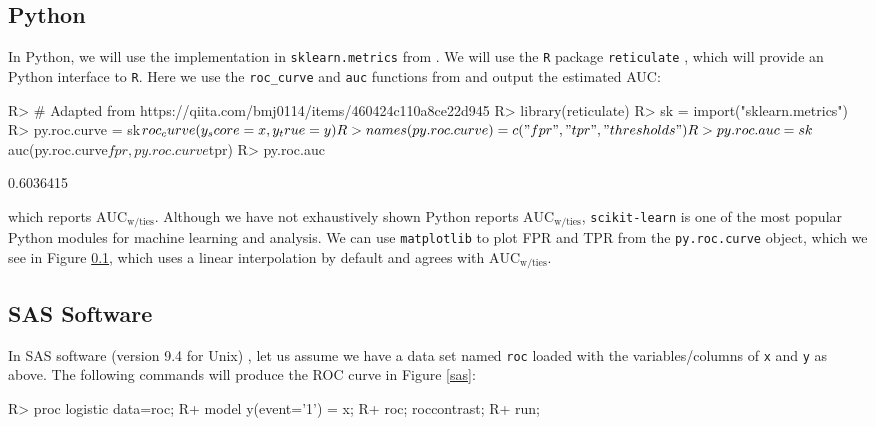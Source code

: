 \documentclass[article]{jss}
\begin{document}
\hypertarget{python}{%
\subsection{Python}\label{python}}

In Python, we will use the implementation in \texttt{sklearn.metrics}
from  \citep{scikitlearn}. We will use the \texttt{R}
package \texttt{reticulate} \citep{reticulate}, which will provide an
Python interface to \texttt{R}. Here we use the \texttt{roc\_curve} and
\texttt{auc} functions from  and output the estimated
AUC:

\begin{CodeChunk}

\begin{CodeInput}
R> # Adapted from https://qiita.com/bmj0114/items/460424c110a8ce22d945
R> library(reticulate)
R> sk = import("sklearn.metrics")
R> py.roc.curve = sk$roc_curve(y_score = x, y_true = y)
R> names(py.roc.curve) = c("fpr", "tpr", "thresholds")
R> py.roc.auc = sk$auc(py.roc.curve$fpr, py.roc.curve$tpr)
R> py.roc.auc
\end{CodeInput}

\begin{CodeOutput}
[1] 0.6036415
\end{CodeOutput}
\end{CodeChunk}

which reports \(\text{AUC}_{\text{w/ties}}\). Although we have not
exhaustively shown Python reports \(\text{AUC}_{\text{w/ties}}\),
\texttt{scikit-learn} is one of the most popular Python modules for
machine learning and analysis. We can use \texttt{matplotlib}
\citep{matplotlib} to plot FPR and TPR from the \texttt{py.roc.curve}
object, which we see in Figure \ref{python}, which uses a linear
interpolation by default and agrees with \(\text{AUC}_{\text{w/ties}}\).

\hypertarget{sas-software}{%
\subsection{SAS Software}\label{sas-software}}

In SAS software (version 9.4 for Unix) \citep{sas}, let us assume we
have a data set named \texttt{roc} loaded with the variables/columns of
\texttt{x} and \texttt{y} as above. The following commands will produce
the ROC curve in Figure \ref{sas}:

\begin{CodeChunk}

\begin{CodeInput}
R>   proc logistic data=roc;
R+       model y(event='1') = x;
R+       roc; roccontrast;
R+       run;      
\end{CodeInput}
\end{CodeChunk}
\end{document}
